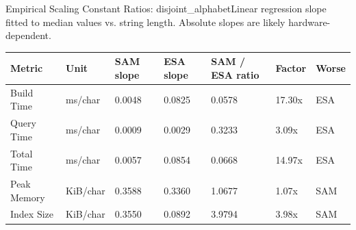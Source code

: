 \begin{benchmarktable}{Empirical Scaling Constant Ratios: disjoint\_alphabet}{Linear regression slope fitted to median values vs. string length. Absolute slopes are likely hardware-dependent.}
\begin{tabularx}{\textwidth}{|X|X|X|X|X|X|X|}
\toprule
Metric & Unit & SAM slope & ESA slope & SAM / ESA ratio & Factor & Worse \\
\midrule
Build Time & ms/char & 0.0048 & 0.0825 & 0.0578 & 17.30x & ESA \\
Query Time & ms/char & 0.0009 & 0.0029 & 0.3233 & 3.09x & ESA \\
Total Time & ms/char & 0.0057 & 0.0854 & 0.0668 & 14.97x & ESA \\
Peak Memory & KiB/char & 0.3588 & 0.3360 & 1.0677 & 1.07x & SAM \\
Index Size & KiB/char & 0.3550 & 0.0892 & 3.9794 & 3.98x & SAM \\
\bottomrule
\end{tabularx}
\end{benchmarktable}